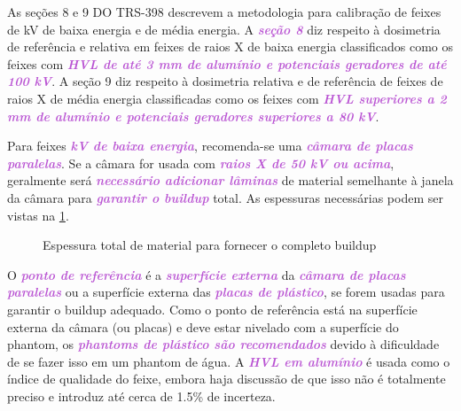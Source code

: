 \documentclass[11pt,a4paper]{article}
\begin{document}
	As seções 8 e 9 DO TRS-398 descrevem a metodologia para calibração de feixes de kV de baixa energia e de média energia. A \textcolor{MediumOrchid}{\textbf{\textit{seção 8}}} diz respeito à dosimetria de referência e relativa em feixes de raios X de baixa energia classificados como os feixes com \textcolor{MediumOrchid}{\textbf{\textit{HVL de até 3 mm de alumínio e potenciais geradores de até 100 kV}}}. A seção 9 diz respeito à dosimetria relativa e de referência de feixes de raios X de média energia classificadas como os feixes com \textcolor{MediumOrchid}{\textbf{\textit{HVL superiores a 2 mm de alumínio e potenciais geradores superiores a 80 kV}}}.
	
	Para feixes \textcolor{MediumOrchid}{\textbf{\textit{kV de baixa energia}}}, recomenda-se uma \textcolor{MediumOrchid}{\textbf{\textit{câmara de placas paralelas}}}. Se a câmara for usada com \textcolor{MediumOrchid}{\textbf{\textit{raios X de 50 kV ou acima}}}, geralmente será \textcolor{MediumOrchid}{\textbf{\textit{necessário adicionar lâminas}}} de material semelhante à janela da câmara para \textcolor{MediumOrchid}{\textbf{\textit{garantir o buildup}}} total. As espessuras necessárias podem ser vistas na \ref{fig:kvEspessuraBuildup}.

	\begin{figure}[h]
		\centering
		\caption{Espessura total de material para fornecer o completo buildup}
		\label{fig:kvEspessuraBuildup}
	\end{figure}
	
	O \textcolor{MediumOrchid}{\textbf{\textit{ponto de referência}}} é a \textcolor{MediumOrchid}{\textbf{\textit{superfície externa}}} da \textcolor{MediumOrchid}{\textbf{\textit{câmara de placas paralelas}}} ou a superfície externa das \textcolor{MediumOrchid}{\textbf{\textit{placas de plástico}}}, se forem usadas para garantir o buildup adequado. Como o ponto de referência está na superfície externa da câmara (ou placas) e deve estar nivelado com a superfície do phantom, os \textcolor{MediumOrchid}{\textbf{\textit{phantoms de plástico são recomendados}}} devido à dificuldade de se fazer isso em um phantom de água. A \textcolor{MediumOrchid}{\textbf{\textit{HVL em alumínio}}} é usada como o índice de qualidade do feixe, embora haja discussão de que isso não é totalmente preciso e introduz até cerca de 1.5\% de incerteza.
	
\end{document}
